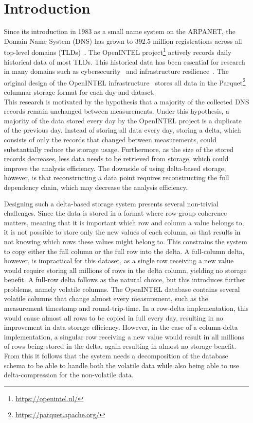 \section{Introduction}

Since its introduction in 1983 as a small name system on the ARPA\-NET, the Domain Name System (DNS) 
has grown to 392.5 million registrations across all top-level domains (TLDs)~\cite{dnib_q1_2026}. 
The OpenINTEL project\footnote{\url{https://openintel.nl/}} actively records daily historical data 
of most TLDs. This historical data has been essential for research in many domains 
such as cybersecurity~\cite{Sommese_2024} and infrastructure resilience~\cite{10.1145/3517745.3561458}.
The original design of the OpenINTEL infrastructure~\cite{7460220} stores all data in the 
Parquet\footnote{\url{https://parquet.apache.org/}} columnar storage format for each day and dataset. \\

This research is motivated by the hypothesis that a majority of the collected DNS records 
remain unchanged between measurements. Under this hypothesis, a majority of the data stored 
every day by the OpenINTEL project is a duplicate of the previous day. Instead of storing 
all data every day, storing a delta, which consists of only the records that changed between measurements, 
could substantially reduce the storage usage. 
Furthermore, as the size of the stored records decreases, less data needs to be retrieved 
from storage, which could improve the analysis efficiency. The downside of using delta-based 
storage, however, is that reconstructing a data point requires reconstructing the full 
dependency chain, which may decrease the analysis efficiency.

Designing such a delta-based storage system presents several non-trivial challenges.
Since the data is stored in a format where row-group coherence matters, meaning that it is important 
which row and column a value belongs to, it is not possible to store only the new values of each 
column, as that results in not knowing which rows these values might belong to. 
This constrains the system to copy either the full column or the full row into the delta. 
A full-column delta, however, is impractical for this dataset, as a single row receiving a new value would 
require storing all millions of rows in the delta column, yielding no storage benefit. A full-row 
delta follows as the natural choice, but this introduces further problems, namely volatile columns.
The OpenINTEL database contains several volatile columns that change almost every 
measurement, such as the measurement timestamp and round-trip-time. In a row-delta implementation, this 
would cause almost all rows to be copied in full every day, resulting in no improvement in 
data storage efficiency. However, in the case of a column-delta implementation, a singular row 
receiving a new value would result in all millions of rows being stored in the delta, again resulting 
in almost no storage benefit. From this it follows that the system needs a decomposition of the database 
schema to be able to handle both the volatile data while also being able to use delta-compression 
for the non-volatile data.\\

